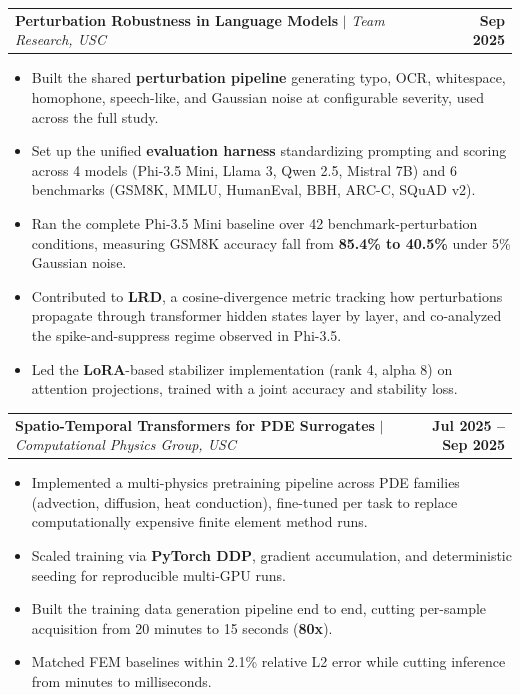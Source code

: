 \documentclass[letterpaper,10pt]{article}
\makeatletter
\newcommand{\todo}[1]{{\color{red}\textbf{[#1]}}}
\newcommand{\resumeItem}[1]{\item{{#1 \vspace{-3pt}}}}
\newcommand{\titleItem}[1]{\textbf{#1}}
\newcommand{\resumeProjectHeading}[2]{
    \item
    \begin{tabular*}{0.97\textwidth}{l@{\extracolsep{\fill}}r}
      #1 & #2 \\
    \end{tabular*}\vspace{-8pt}
}
\newcommand{\resumeItemListStart}{\begin{itemize}}
\newcommand{\resumeItemListEnd}{\end{itemize}\vspace{-7pt}}
\makeatother
\begin{document}
    
    \vspace{1mm}
      \resumeProjectHeading
       {\titleItem{Perturbation Robustness in Language Models} $|$ \emph{Team Research, USC}  }{\textbf{Sep 2025}}
      \resumeItemListStart
      \vspace{1mm}
        \resumeItem{Built the shared \textbf{perturbation pipeline} generating typo, OCR, whitespace, homophone, speech-like, and Gaussian noise at configurable severity, used across the full study.}
        \resumeItem{Set up the unified \textbf{evaluation harness} standardizing prompting and scoring across 4 models (Phi-3.5 Mini, Llama 3, Qwen 2.5, Mistral 7B) and 6 benchmarks (GSM8K, MMLU, HumanEval, BBH, ARC-C, SQuAD v2).}
        \resumeItem{Ran the complete Phi-3.5 Mini baseline over 42 benchmark-perturbation conditions, measuring GSM8K accuracy fall from \textbf{85.4\% to 40.5\%} under 5\% Gaussian noise.}
        \resumeItem{Contributed to \textbf{LRD}, a cosine-divergence metric tracking how perturbations propagate through transformer hidden states layer by layer, and co-analyzed the spike-and-suppress regime observed in Phi-3.5.}
        \resumeItem{Led the \textbf{LoRA}-based stabilizer implementation (rank 4, alpha 8) on attention projections, trained with a joint accuracy and stability loss.}
      \resumeItemListEnd

    \vspace{1mm}
    \resumeProjectHeading
      {\titleItem{Spatio-Temporal Transformers for PDE Surrogates} $|$ \emph{Computational Physics Group, USC}}{\textbf{Jul 2025 -- Sep 2025}}
      \resumeItemListStart
      \vspace{1mm}
        \resumeItem{Implemented a multi-physics pretraining pipeline across PDE families (advection, diffusion, heat conduction), fine-tuned per task to replace computationally expensive finite element method runs.}
        \resumeItem{Scaled training via \textbf{PyTorch DDP}, gradient accumulation, and deterministic seeding for reproducible multi-GPU runs.}
        \resumeItem{Built the training data generation pipeline end to end, cutting per-sample acquisition from 20 minutes to 15 seconds (\textbf{80x}).}
        \resumeItem{Matched FEM baselines within 2.1\% relative L2 error while cutting inference from minutes to milliseconds.} 
      \resumeItemListEnd
\end{document}
